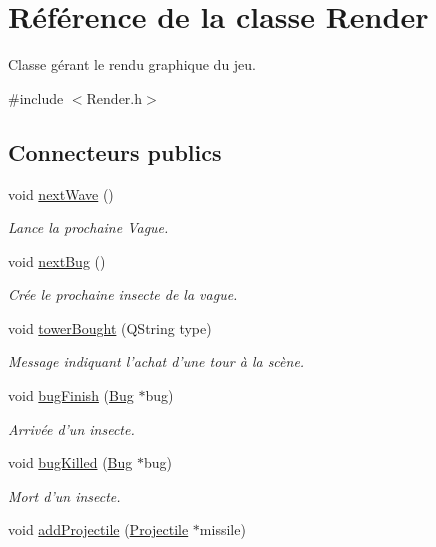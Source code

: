 \hypertarget{classRender}{
\section{Référence de la classe Render}
\label{classRender}
}


Classe gérant le rendu graphique du jeu.  




{\ttfamily \#include $<$Render.h$>$}

\subsection*{Connecteurs publics}
\begin{DoxyCompactItemize}
\item 
void \hyperlink{classRender_a3252d02e9509f342bc96129b4b10b415}{nextWave} ()
\begin{DoxyCompactList}\small\item\em Lance la prochaine Vague. \end{DoxyCompactList}\item 
void \hyperlink{classRender_a9413625fc472b4b7806f3a0d615d6ea9}{nextBug} ()
\begin{DoxyCompactList}\small\item\em Crée le prochaine insecte de la vague. \end{DoxyCompactList}\item 
void \hyperlink{classRender_a8e2eccb2fc3914198b8939bf0625c955}{towerBought} (QString type)
\begin{DoxyCompactList}\small\item\em Message indiquant l'achat d'une tour à la scène. \end{DoxyCompactList}\item 
void \hyperlink{classRender_aeeddbbe27102625cc2d5234fa0be523a}{bugFinish} (\hyperlink{classBug}{Bug} $\ast$bug)
\begin{DoxyCompactList}\small\item\em Arrivée d'un insecte. \end{DoxyCompactList}\item 
void \hyperlink{classRender_a940007358a139d0b30e002929d24f770}{bugKilled} (\hyperlink{classBug}{Bug} $\ast$bug)
\begin{DoxyCompactList}\small\item\em Mort d'un insecte. \end{DoxyCompactList}\item 
void \hyperlink{classRender_a3b5bb3705131ca57252398e0f6a9e3e5}{addProjectile} (\hyperlink{classProjectile}{Projectile} $\ast$missile)

\end{DoxyCompactItemize}
